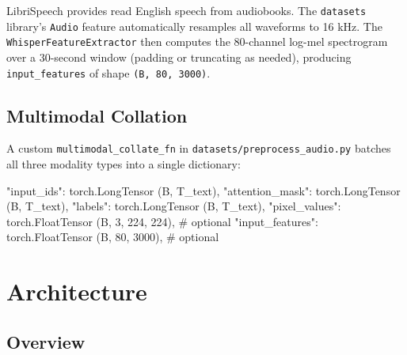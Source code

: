 \documentclass[11pt]{article}
\begin{document}
LibriSpeech provides read English speech from audiobooks. The \texttt{datasets} library's \texttt{Audio} feature automatically resamples all waveforms to 16 kHz. The \texttt{WhisperFeatureExtractor} then computes the 80-channel log-mel spectrogram over a 30-second window (padding or truncating as needed), producing \texttt{input\_features} of shape \texttt{(B, 80, 3000)}.


\subsection{Multimodal Collation}


A custom \texttt{multimodal\_collate\_fn} in \texttt{datasets/preprocess\_audio.py} batches all three modality types into a single dictionary:


\begin{CodeBlock}
{
    "input_ids":       torch.LongTensor  (B, T_text),
    "attention_mask":  torch.LongTensor  (B, T_text),
    "labels":          torch.LongTensor  (B, T_text),
    "pixel_values":    torch.FloatTensor (B, 3, 224, 224),   # optional
    "input_features":  torch.FloatTensor (B, 80, 3000),      # optional
}
\end{CodeBlock}



\section{Architecture}


\subsection{Overview}
\end{document}

